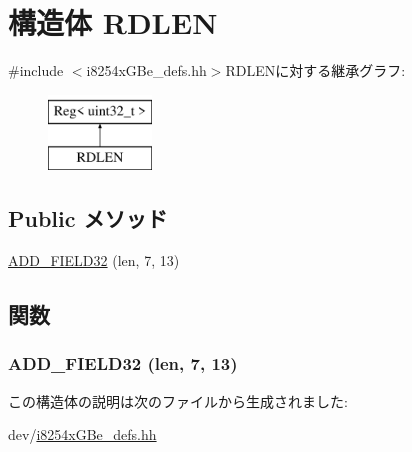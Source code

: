 \hypertarget{structiGbReg_1_1Regs_1_1RDLEN}{
\section{構造体 RDLEN}
\label{structiGbReg_1_1Regs_1_1RDLEN}
}


{\ttfamily \#include $<$i8254xGBe\_\-defs.hh$>$}RDLENに対する継承グラフ:\begin{figure}[H]
\begin{center}
\leavevmode
\includegraphics[height=2cm]{structiGbReg_1_1Regs_1_1RDLEN}
\end{center}
\end{figure}
\subsection*{Public メソッド}
\begin{DoxyCompactItemize}
\item 
\hyperlink{structiGbReg_1_1Regs_1_1RDLEN_a6fbef5d44faf04ee8eafeddc2bbcd708}{ADD\_\-FIELD32} (len, 7, 13)
\end{DoxyCompactItemize}


\subsection{関数}
\hypertarget{structiGbReg_1_1Regs_1_1RDLEN_a6fbef5d44faf04ee8eafeddc2bbcd708}{
\subsubsection[{ADD\_\-FIELD32}]{\setlength{\rightskip}{0pt plus 5cm}ADD\_\-FIELD32 (len, \/  7, \/  13)}}
\label{structiGbReg_1_1Regs_1_1RDLEN_a6fbef5d44faf04ee8eafeddc2bbcd708}


この構造体の説明は次のファイルから生成されました:\begin{DoxyCompactItemize}
\item 
dev/\hyperlink{i8254xGBe__defs_8hh}{i8254xGBe\_\-defs.hh}\end{DoxyCompactItemize}
